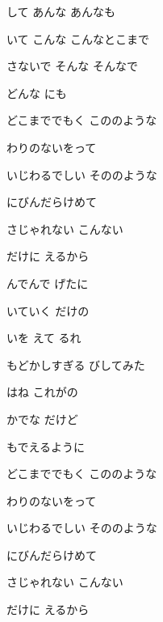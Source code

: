 \documentclass[14pt]{extreport}
\begin{document}
{\item
  して あんな あんなも
  \jisho{}

  いて こんな こんなとこまで
  \jisho{}

  さないで そんな そんなで
  \jisho{}

  どんな にも
  \jisho{}

\item
  どこまででもく こののような
  \jisho{}

  わりのないをって
  \jisho{}

\item
  いじわるでしい そののような
  \jisho{}

  にびんだらけめて
  \jisho{}

\item
  さじゃれない こんない
  \jisho{}

  だけに  えるから
  \jisho{}

\item
  んでんで げたに
  \jisho{}

  いていく だけの
  \jisho{}

\item
  いを えて るれ
  \jisho{}

\item
  もどかしすぎる びしてみた
  \jisho{}

  はね これがの
  \jisho{}

\item
  かでな だけど
  \jisho{}

  もでえるように
  \jisho{}

\item
  どこまででもく こののような
  \jisho{}

  わりのないをって
  \jisho{}

\item
  いじわるでしい そののような
  \jisho{}

  にびんだらけめて
  \jisho{}

\item
  さじゃれない こんない
  \jisho{}

  だけに  えるから
  \jisho{}


}
\end{document}
